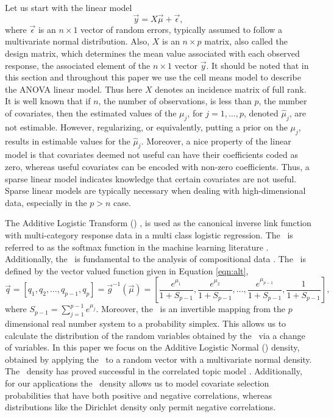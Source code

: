 Let us start with the linear model
\begin{equation}\label{def:linear_model}
\vec{y} = X\vec{\mu} + \vec{\epsilon},
\end{equation}
where $\vec{\epsilon}$ is an $n \times 1$ vector of random errors, typically assumed to follow a multivariate normal distribution. Also, $X$ is an $n \times p$ matrix, also called the design matrix, which determines the mean value associated with each observed response, the associated element of the $n\times 1$ vector $\vec{y}$. It should be noted that in this section and throughout this paper we use the cell means model to describe the ANOVA linear model. Thus here $X$ denotes an incidence matrix of full rank. It is well known that if $n$, the number of observations, is less than $p$, the number of covariates, then the estimated values of the $\mu_j$, for $j=1,\dots,p$, denoted $\hat{\mu}_j$, are not estimable. However, regularizing, or equivalently, putting a prior on the $\mu_j$, results in estimable values for the $\hat{\mu}_j$. Moreover, a nice property of the linear model is that covariates deemed not useful can have their coefficients coded as zero, whereas useful covariates can be encoded with non-zero coefficients. Thus, a sparse linear model indicates knowledge that certain covariates are not useful. Sparse linear models are typically necessary when dealing with high-dimensional data, especially in the $p>n$ case. 

The Additive Logistic Transform (\ALT) , is used as the canonical inverse link function \cite{mccullagh1989generalized} with multi-category response data in a multi class logistic regression. The \ALT\ is referred to as the softmax function in the machine learning literature \cite{bishop2006pattern}. Additionally, the \ALT\ is fundamental to the analysis of compositional data \cite{aitchison1986statistical}. The \ALT\ is defined by the vector valued function given in Equation \ref{eqn:alt}, 
\begin{equation}\label{eqn:alt}
\vec{q} = \left[ q_1, q_2,\dots, q_{p-1}, q_p \right] =\vec{g}^{-1}(\vec{\mu})= \left[ \frac{e^{\mu_1}}{1+S_{p-1}},\frac{e^{\mu_2}}{1+S_{p-1}}, \dots,\frac{e^{\mu_{p-1}}}{1+S_{p-1}},\frac{1}{1+S_{p-1}} \right],\end{equation} 
where $S_{p-1}=\sum_{j=1}^{p-1}e^{\mu_j}$. Moreover, the \ALT\ is an invertible mapping from the $p$ dimensional real number system to a probability simplex. This allows us to calculate the distribution of the random variables obtained by the \ALT\ via a change of variables. In this paper we focus on the Additive Logistic Normal (\ALN) density, obtained by applying the \ALT\ to a random vector with a multivariate normal density. The \ALN\ density has proved successful in the correlated topic model \cite{blei2007correlated,lafferty2005correlated}.  Additionally, for our applications the \ALN\ density allows us to model covariate selection probabilities that have both positive and negative correlations, whereas distributions like the Dirichlet density only permit negative correlations.


